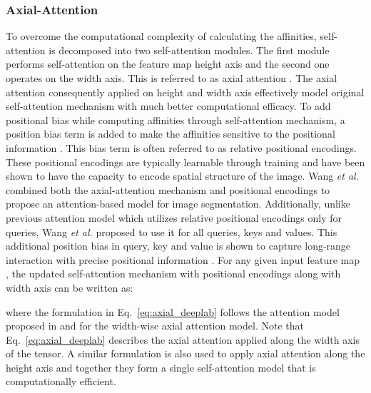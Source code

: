 \documentclass[runningheads]{llncs}
\begin{document}
	\subsubsection{Axial-Attention}
	To overcome the computational complexity of calculating the affinities, self-attention is decomposed into two self-attention modules. The first module performs self-attention on the feature map height axis and the second one operates on the width axis. This is referred to as axial attention \cite{ho2019axial}. The axial attention consequently applied on height and width axis effectively model original self-attention mechanism with much better computational efficacy. To add positional bias while computing affinities through self-attention mechanism, a position bias term is added to make the affinities sensitive to the positional information \cite{shaw2018self}. This bias term is often referred to as relative positional encodings. These positional encodings are typically learnable through training and have been shown to have the capacity to encode spatial structure of the image. Wang \emph{et al.} \cite{wang2020axial} combined both the axial-attention mechanism and positional encodings to propose an attention-based model for image segmentation. Additionally, unlike previous attention model which utilizes relative positional encodings only for queries, Wang \emph{et al.} \cite{wang2020axial} proposed to use it for all queries, keys and values. This additional position bias in query, key and value is shown to capture long-range interaction with precise positional information \cite{wang2020axial}. For any given input feature map , the updated self-attention mechanism with positional encodings along with width axis can be written as:
	
	where the formulation in Eq.~\ref{eq:axial_deeplab} follows the attention model proposed in \cite{wang2020axial} and  for the width-wise axial attention model. Note that  Eq.~\ref{eq:axial_deeplab} describes the axial attention applied along  the width axis of the tensor.   A similar formulation is also used to apply axial attention along the height axis and together they form a single self-attention model that is computationally efficient.
	
\end{document}
